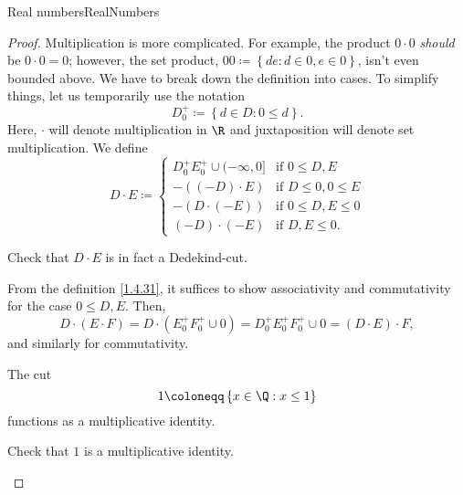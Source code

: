 \begin{thm}{Real numbers}{RealNumbers}
\begin{proof}
Multiplication is more complicated.  For example, the product $0\cdot 0$ \emph{should} be $0\cdot 0=0$; however, the set product, $00\coloneqq \left\{ de:d\in 0,e\in 0\right\}$, isn't even bounded above.  We have to break down the definition into cases.  To simplify things, let us temporarily use the notation
\begin{equation}
D_0^+\coloneqq \left\{ d\in D:0\leq d\right\} .
\end{equation}
Here, $\cdot$ will denote multiplication in $\R$ and juxtaposition will denote set multiplication.  We define
\begin{equation}\label{1.4.31}
D\cdot E\coloneqq \begin{cases}D_0^+E_0^+\cup (-\infty ,0] & \text{if }0\leq D,E  \\ -\left( (-D)\cdot E\right) & \text{if }D\leq 0,0\leq E \\ -\left( D\cdot (-E)\right) & \text{if }0\leq D,E\leq 0 \\ (-D)\cdot (-E) & \text{if }D,E\leq 0.\end{cases}
\end{equation}
\begin{exr}[breakable=false]{}{}
Check that $D\cdot E$ is in fact a Dedekind-cut.
\end{exr}

From the definition \eqref{1.4.31}, it suffices to show associativity and commutativity for the case $0\leq D,E$.  Then,
\begin{equation}
D\cdot (E\cdot F)=D\cdot \left( E_0^+F_0^+\cup 0\right) =D_0^+E_0^+F_0^+\cup 0=(D\cdot E)\cdot F,
\end{equation}
and similarly for commutativity.  

The cut
\begin{equation}
1\coloneqq \left\{ x\in \Q :x\leq 1\right\}
\end{equation}
functions as a multiplicative identity.
\begin{exr}[breakable=false]{}{}
Check that $1$ is a multiplicative identity.
\end{exr}


\end{proof}
\end{thm}
